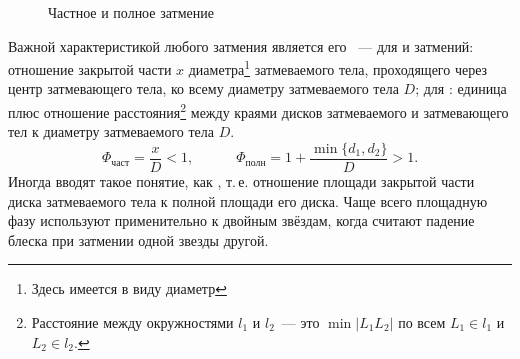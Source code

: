 \begin{wrapfigure}[8]{r}{.42\tw}
    \caption{Частное и полное затмение}
    \label{fig:part-eclipses-scheme}
\end{wrapfigure}
Важной характеристикой любого затмения является его ~--- для  и  затмений: отношение закрытой части $x$ диаметра\footnote{Здесь имеется в виду  диаметр} затмеваемого тела, проходящего через центр затмевающего тела, ко всему диаметру затмеваемого тела $D$; для : единица плюс отношение расстояния\footnote{Расстояние между окружностями $l_1$ и $l_2$~--- это $\min |L_1L_2|$ по всем $L_1 \in l_1$ и $L_2 \in l_2$.} между краями дисков затмеваемого и затмевающего тел к диаметру затмеваемого тела $D$.
\begin{equation}
    \Phi_{\text{част}} = \frac{x}{D} < 1, \quad \quad \quad \Phi_{\text{полн}} =  1 + \frac{\min\{d_1, d_2\}}{D} > 1.
\end{equation}
Иногда вводят такое понятие, как , т.\,е. отношение площади закрытой части диска затмеваемого тела к полной площади его диска. Чаще всего  площадную фазу используют применительно к двойным звёздам, когда считают падение блеска при затмении одной звезды другой.
